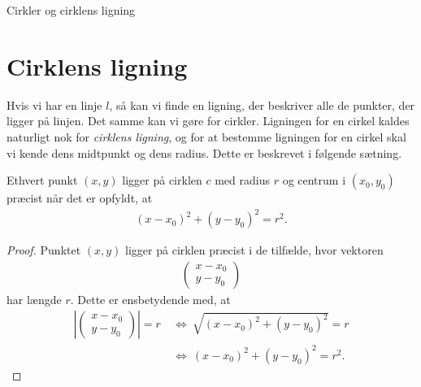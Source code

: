 \documentclass[12pt]{article}
\begin{document}



\begin{center}
\Huge
Cirkler og cirklens ligning
\end{center}
\section*{Cirklens ligning}

Hvis vi har en linje $l$, så kan vi finde en ligning, der beskriver alle de punkter, der ligger på linjen. Det samme kan vi gøre for cirkler. Ligningen for en cirkel kaldes naturligt nok for \textit{cirklens ligning}, og for at bestemme ligningen for en cirkel skal vi kende dens midtpunkt og dens radius. Dette er beskrevet i følgende sætning.
\begin{setn}
Ethvert punkt $(x,y)$ ligger på cirklen $c$ med radius $r$ og centrum i $(x_0,y_0)$ præcist når det er opfyldt, at 
\begin{align*}
(x-x_0)^2+(y-y_0)^2 = r^2.
\end{align*}
\end{setn}
\begin{proof}
Punktet $(x,y)$ ligger på cirklen præcist i de tilfælde, hvor vektoren 
\begin{align*}
\begin{pmatrix}
x-x_0 \\ y-y_0
\end{pmatrix}
\end{align*}
har længde $r$. Dette er ensbetydende med, at 
\begin{align*}
\left|\begin{pmatrix}
x-x_0 \\ y-y_0
\end{pmatrix}\right| = r \ &\Leftrightarrow \ \sqrt{(x-x_0)^2+(y-y_0)^2} = r \\
&\Leftrightarrow \ (x-x_0)^2+(y-y_0)^2 = r^2.
\end{align*}
\end{proof}
\end{document}

